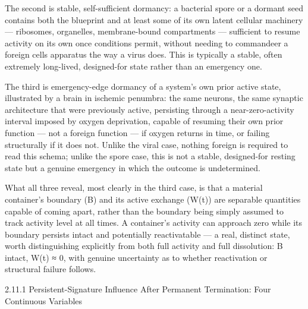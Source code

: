 \documentclass[
]{article}
\begin{document}
The second is stable, self-sufficient dormancy: a bacterial spore or a
dormant seed contains both the blueprint and at least some of its own
latent cellular machinery --- ribosomes, organelles, membrane-bound
compartments --- sufficient to resume activity on its own once
conditions permit, without needing to commandeer a foreign cells
apparatus the way a virus does. This is typically a stable, often
extremely long-lived, designed-for state rather than an emergency one.

The third is emergency-edge dormancy of a system's own prior active
state, illustrated by a brain in ischemic penumbra: the same neurons,
the same synaptic architecture that were previously active, persisting
through a near-zero-activity interval imposed by oxygen deprivation,
capable of resuming their own prior function --- not a foreign function
--- if oxygen returns in time, or failing structurally if it does not.
Unlike the viral case, nothing foreign is required to read this schema;
unlike the spore case, this is not a stable, designed-for resting state
but a genuine emergency in which the outcome is undetermined.

What all three reveal, most clearly in the third case, is that a
material container's boundary (B) and its active exchange (W(t)) are
separable quantities capable of coming apart, rather than the boundary
being simply assumed to track activity level at all times. A container's
activity can approach zero while its boundary persists intact and
potentially reactivatable --- a real, distinct state, worth
distinguishing explicitly from both full activity and full dissolution:
B intact, W(t) ≈ 0, with genuine uncertainty as to whether reactivation
or structural failure follows.

2.11.1 Persistent-Signature Influence After Permanent Termination: Four
Continuous Variables
\end{document}
